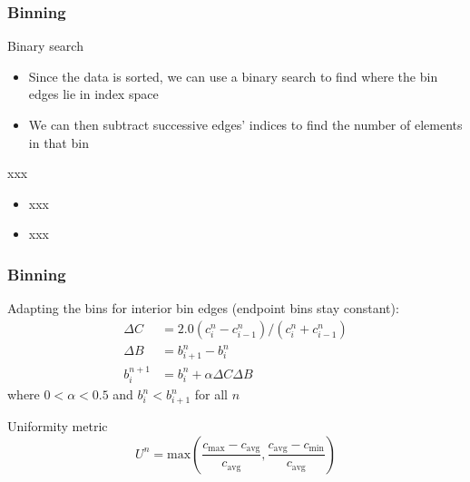 \documentclass{beamer}
\begin{document}
\begin{frame}	
	\frametitle{Binning}
	
	\begin{block}{Binary search}
		\begin{itemize}
			\item Since the data is sorted, we can use a binary search to find where the bin edges lie in index space
			\item We can then subtract successive edges' indices to find the number of elements in that bin
		\end{itemize}
	\end{block}
	
	\begin{block}{xxx}
		\begin{itemize}
			\item xxx
			\item xxx
		\end{itemize}
	\end{block}
\end{frame}

\begin{frame}
	\frametitle{Binning}
	
	\begin{block}{Adapting the bins}
		for interior bin edges (endpoint bins stay constant):
		\begin{equation}
			\begin{split}
				\Delta C & = 2.0 ( c_i^n - c_{i-1}^n ) / ( c_i^n + c_{i-1}^n ) \\
				\Delta B & = b_{i+1}^n - b_i^n \\
				b_i^{n+1} & = b_i^n + \alpha \Delta C \Delta B
			\end{split}
		\end{equation}
		where $0 < \alpha < 0.5$ and $b_i^n < b_{i+1}^n$ for all $n$
	\end{block}
	
	\begin{block}{Uniformity metric}
		\begin{equation}
			U^n = \textrm{max}( \dfrac{c_{\textrm{max}} - c_{\textrm{avg}}}{c_{\textrm{avg}}}, \dfrac{c_{\textrm{avg}} - c_{\textrm{min}}}{c_{\textrm{avg}}} )
		\end{equation}
	\end{block}
\end{frame}
\end{document}
